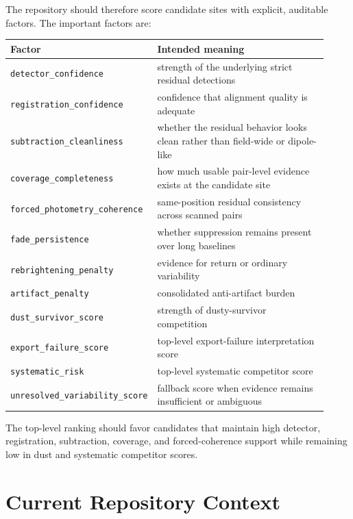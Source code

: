 \documentclass[11pt]{article}
\begin{document}
The repository should therefore score candidate sites with explicit, auditable factors. The important factors are:
\begin{center}
\begin{tabular}{p{0.32\linewidth} p{0.60\linewidth}}
\toprule
Factor & Intended meaning \\
\midrule
\texttt{detector\_confidence} & strength of the underlying strict residual detections \\
\texttt{registration\_confidence} & confidence that alignment quality is adequate \\
\texttt{subtraction\_cleanliness} & whether the residual behavior looks clean rather than field-wide or dipole-like \\
\texttt{coverage\_completeness} & how much usable pair-level evidence exists at the candidate site \\
\texttt{forced\_photometry\_coherence} & same-position residual consistency across scanned pairs \\
\texttt{fade\_persistence} & whether suppression remains present over long baselines \\
\texttt{rebrightening\_penalty} & evidence for return or ordinary variability \\
\texttt{artifact\_penalty} & consolidated anti-artifact burden \\
\texttt{dust\_survivor\_score} & strength of dusty-survivor competition \\
\texttt{export\_failure\_score} & top-level export-failure interpretation score \\
\texttt{systematic\_risk} & top-level systematic competitor score \\
\texttt{unresolved\_variability\_score} & fallback score when evidence remains insufficient or ambiguous \\
\bottomrule
\end{tabular}
\end{center}

The top-level ranking should favor candidates that maintain high detector, registration, subtraction, coverage, and forced-coherence support while remaining low in dust and systematic competitor scores.

\section{Current Repository Context}
\end{document}
